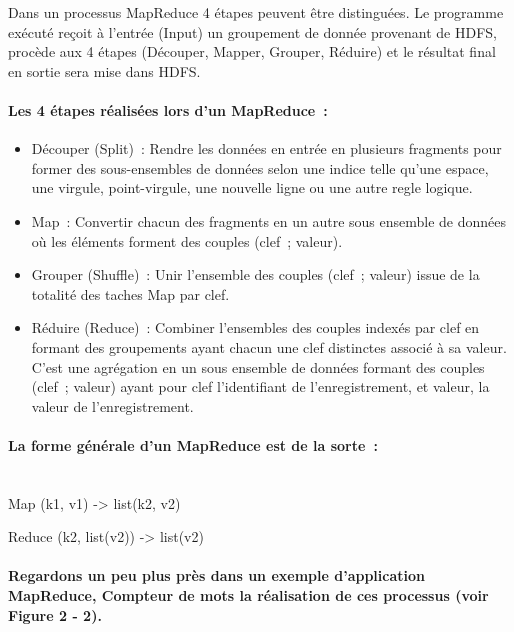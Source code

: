 \documentclass[12pt,french]{book}
\begin{document}
Dans un processus MapReduce 4 étapes peuvent être distinguées.
Le programme exécuté reçoit à l’entrée (Input) un groupement de donnée provenant de HDFS, procède aux 4 étapes (Découper, Mapper, Grouper, Réduire) et le résultat final en sortie sera mise dans HDFS.

\paragraph{Les 4 étapes réalisées lors d’un MapReduce :}

\begin{itemize}  
\item 
Découper (Split) : Rendre les données en entrée en plusieurs fragments pour former des sous-ensembles de données selon une indice telle qu'une espace, une virgule, point-virgule, une nouvelle ligne ou une autre regle logique.
\item
Map : Convertir chacun des fragments en un autre sous ensemble de données où les éléments forment des couples (clef ; valeur).   
\item
Grouper (Shuffle) : Unir l’ensemble des couples (clef ; valeur) issue de la totalité des taches Map par clef.  
\item
Réduire (Reduce) : Combiner l’ensembles des couples indexés par clef en formant des groupements ayant chacun une clef distinctes associé à sa valeur.  C’est une agrégation en un sous ensemble de données formant des couples (clef ; valeur) ayant pour clef l’identifiant de l’enregistrement, et valeur, la valeur de l’enregistrement.
\end{itemize}


\paragraph{La forme générale d’un MapReduce est de la sorte :}\mbox{}\\

Map		(k1, v1)		->		list(k2, v2)

Reduce	(k2, list(v2))	->		list(v2)

\paragraph{Regardons un peu plus près dans un exemple d’application MapReduce, Compteur de mots la réalisation de ces processus (voir Figure 2 - 2).}

\newpage
\end{document}
